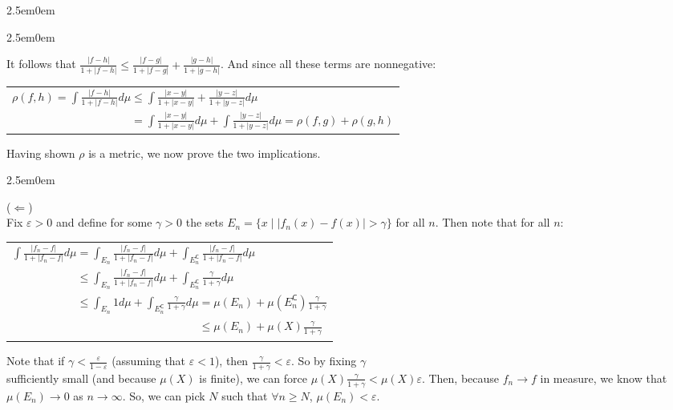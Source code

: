 \documentclass{book}
\newenvironment{myIndent}{%
   \begin{adjustwidth}{2.5em}{0em}%
}{%
   \end{adjustwidth}%
}
\newcommand{\comp}{\mathsf{C}}
\newcommand{\retTwo}{\hfill\bigbreak}
\begin{document}
\begin{myIndent}
\begin{myIndent}
		It follows that $\frac{|f - h|}{1 + |f - h|} \leq \frac{|f - g|}{1 + |f - g|} + \frac{|g-h|}{1 + |g-h|}$. And since all these terms are nonnegative:

		{\centering 
		\begin{tabular}{l}
			$\rho(f, h) = \int \frac{|f - h|}{1 + |f - h|} d\mu \leq  \int \frac{|x - y|}{1 + |x - y|} + \frac{|y - z|}{1 + |y - z|}d\mu$\\ [8pt]
			
			$\phantom{\rho(f, h) = \int \frac{|f - h|}{1 + |f - h|} d\mu } = \int \frac{|x - y|}{1 + |x - y|}d\mu + \int\frac{|y - z|}{1 + |y - z|}d\mu = \rho(f, g) + \rho(g, h)$
		\end{tabular} \retTwo\par}
	\end{myIndent}

	Having shown $\rho$ is a metric, we now prove the two implications.\\
	\begin{myIndent}
		($\Longleftarrow$)\\
		Fix $\varepsilon > 0$ and define for some $\gamma > 0$ the sets $E_n = \{x \mid |f_n(x) - f(x)| > \gamma\}$ for all $n$. Then note that for all $n$:

		{\center 
		\begin{tabular}{l}
			$\int \frac{|f_n-f|}{1 + |f_n-f|}d\mu = \int_{E_n}\frac{|f_n-f|}{1 + |f_n-f|}d\mu + \int_{E_n^{\comp}}\frac{|f_n-f|}{1 + |f_n-f|}d\mu$\\ [8pt]

			$\phantom{\int \frac{|f_n-g|}{1 + |f_n-f|}d\mu} \leq \int_{E_n}\frac{|f_n-f|}{1 + |f_n-f|}d\mu + \int_{E_n^{\comp}}\frac{\gamma}{1 + \gamma}d\mu$\\ [8pt]

			$\phantom{\int \frac{|f_n-g|}{1 + |f_n-f|}d\mu} \leq \int_{E_n}1d\mu + \int_{E_n^{\comp}}\frac{\gamma}{1 + \gamma}d\mu = \mu(E_n) + \mu(E_n^\comp)\frac{\gamma}{1 + \gamma}$\\ [4pt]

			$\phantom{\int \frac{|f_n-g|}{1 + |f_n-f|}d\mu \leq \int_{E_n}1d\mu + \int_{E_n^{\comp}}\frac{\gamma}{1 + \gamma}d\mu} \leq \mu(E_n) + \mu(X)\frac{\gamma}{1 + \gamma}$
		\end{tabular}\retTwo\par}

		Note that if $\gamma < \frac{\varepsilon}{1 - \varepsilon}$ (assuming that $\varepsilon < 1$), then $\frac{\gamma}{1 + \gamma} < \varepsilon$. So by fixing $\gamma$\\ sufficiently small (and because $\mu(X)$ is finite), we can force $\mu(X)\frac{\gamma}{1 + \gamma} < \mu(X)\varepsilon$. Then, because $f_n \rightarrow f$ in measure, we know that $\mu(E_n) \rightarrow 0$ as $n \rightarrow \infty$. So, we can pick $N$ such that $\forall n \geq N$, $\mu(E_n) < \varepsilon$.\newpage
		

\end{myIndent}
\end{myIndent}
\end{document}
